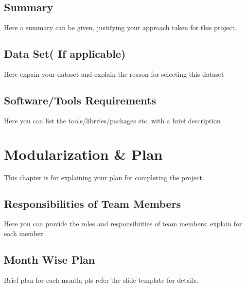 \documentclass[BTech]{ugthesis}
\begin{document}
\section{Summary}
Here a summary can be given, justifying your approach taken for this project.

\section{Data Set( If applicable)}
Here expain your dataset and explain the reason for selecting this dataset
\section{Software/Tools Requirements}
Here you can list the tools/librries/packages etc. with a brief description
\chapter{Modularization \& Plan}
This chapter is for explaining your plan for completing the project.
\section{ Responsibilities of Team Members}
Here you can provide the roles and responsibiities of team members; explain for each member.
\section{Month Wise Plan}
Brief plan for each month; pls refer the slide template for details.

\begin{singlespace}
\end{singlespace}
  
\end{document}
